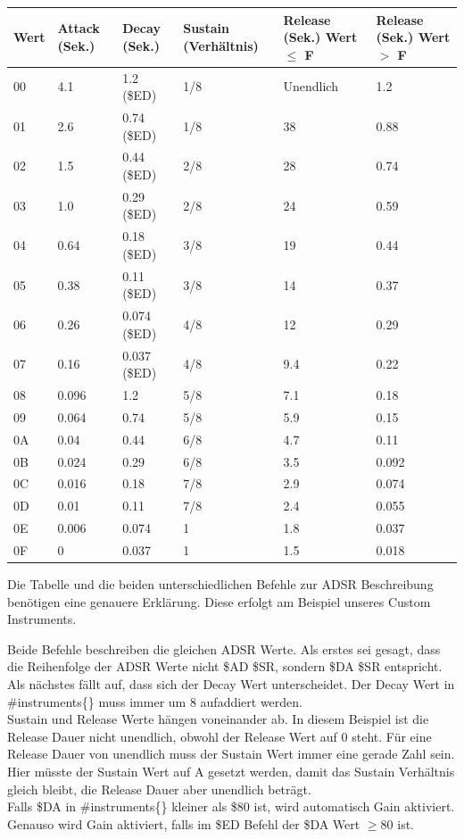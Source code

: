 \begin{tabularx}{\textwidth}{|l|X|X|X|X|X|}
	\hline
	Wert & Attack (Sek.) & Decay (Sek.)  & Sustain (Verhältnis) & Release (Sek.) Wert $\leq$ F & Release (Sek.) Wert $>$ F \\
	\hline
	00 & 4.1 & 1.2 (\$ED) & 1/8 & Unendlich & 1.2\\
	\hline
	01 & 2.6 & 0.74 (\$ED) & 1/8 & 38 & 0.88 \\
	\hline
	02 & 1.5 & 0.44 (\$ED) & 2/8 & 28 & 0.74 \\
	\hline
	03 & 1.0 & 0.29 (\$ED) & 2/8 & 24 & 0.59 \\
	\hline
	04 & 0.64 & 0.18 (\$ED) & 3/8 & 19 & 0.44 \\
	\hline
	05 & 0.38 & 0.11 (\$ED) & 3/8 & 14 & 0.37 \\
	\hline
	06 & 0.26 & 0.074 (\$ED) & 4/8 & 12 & 0.29 \\
	\hline
	07 & 0.16 & 0.037 (\$ED) & 4/8 & 9.4 & 0.22 \\
	\hline
	08 & 0.096 & 1.2 & 5/8 & 7.1 & 0.18 \\
	\hline
	09 & 0.064 & 0.74 & 5/8 & 5.9 & 0.15 \\
	\hline
	0A & 0.04 & 0.44 & 6/8 & 4.7 & 0.11 \\
	\hline
	0B & 0.024 & 0.29 & 6/8 & 3.5 & 0.092 \\
	\hline
	0C & 0.016 & 0.18 & 7/8 & 2.9 & 0.074 \\
	\hline
	0D & 0.01 & 0.11 & 7/8 & 2.4 & 0.055 \\
	\hline
	0E & 0.006 & 0.074 & 1 & 1.8 & 0.037 \\
	\hline
	0F & 0 & 0.037 & 1 & 1.5 & 0.018 \\
	\hline
\end{tabularx}

\bigskip

Die Tabelle und die beiden unterschiedlichen Befehle zur ADSR Beschreibung benötigen eine genauere Erklärung. Diese erfolgt am Beispiel unseres Custom Instruments.


\medskip



\medskip

Beide Befehle beschreiben die gleichen ADSR Werte. Als erstes sei gesagt, dass die Reihenfolge der ADSR Werte nicht \$AD \$SR, sondern \$DA \$SR entspricht. \\
Als nächstes fällt auf, dass sich der Decay Wert unterscheidet. Der Decay Wert in \#instruments\{\} muss immer um 8 aufaddiert werden. \\
Sustain und Release Werte hängen voneinander ab. In diesem Beispiel ist die Release Dauer nicht unendlich, obwohl der Release Wert auf 0 steht. Für eine Release Dauer von unendlich muss der Sustain Wert immer eine gerade Zahl sein. Hier müsste der Sustain Wert auf A gesetzt werden, damit das Sustain Verhältnis gleich bleibt, die Release Dauer aber unendlich beträgt. \\
Falls \$DA in \#instruments\{\} kleiner als \$80 ist, wird automatisch Gain aktiviert. Genauso wird Gain aktiviert, falls im \$ED Befehl der \$DA Wert $\geq 80$ ist.

